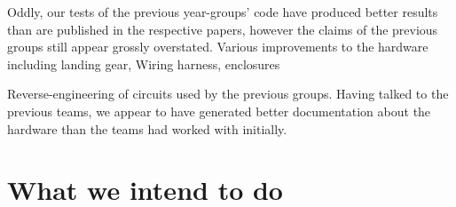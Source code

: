 \documentclass[11pt]{article}
\begin{document}
  Oddly, our tests of the previous year-groups' code have produced better results than are published in the respective papers, however the claims of the previous groups still appear grossly overstated.
  Various improvements to the hardware including landing gear, Wiring harness, enclosures

  Reverse-engineering of circuits used by the previous groups. Having talked to the previous teams, we appear to have generated better documentation about the hardware than the teams had worked with initially.


  \section{What we intend to do}


	
\end{document}
